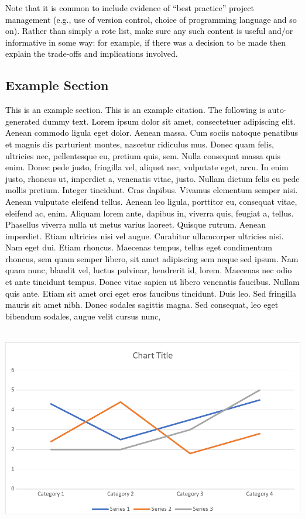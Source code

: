 \documentclass[a4paper]{article}
\begin{document}
\bigskip

\textcolor{black}{Note that it is common to include evidence of ``best practice'' project management (e.g., use of
version control, choice of programming language and so on). Rather than simply a rote list, make sure any such content
is useful and/or informative in some way: for example, if there was a decision to be made then explain the trade-offs
and implications involved.}


\bigskip

\subsection{Example Section}
\hypertarget{Toc98342035}{}
\bigskip

\textcolor{black}{This is an example section. This is an example citation. The following is auto-generated dummy text.
Lorem ipsum dolor sit amet, consectetuer adipiscing elit. Aenean commodo ligula eget dolor. Aenean massa. Cum sociis
natoque penatibus et magnis dis parturient montes, nascetur ridiculus mus. Donec quam felis, ultricies nec,
pellentesque eu, pretium quis, sem. Nulla consequat massa quis enim. Donec pede justo, fringilla vel, aliquet nec,
vulputate eget, arcu. In enim justo, rhoncus ut, imperdiet a, venenatis vitae, justo. Nullam dictum felis eu pede
mollis pretium. Integer tincidunt. Cras dapibus. Vivamus elementum semper nisi. Aenean vulputate eleifend tellus.
Aenean leo ligula, porttitor eu, consequat vitae, eleifend ac, enim. Aliquam lorem ante, dapibus in, viverra quis,
feugiat a, tellus. Phasellus viverra nulla ut metus varius laoreet. Quisque rutrum. Aenean imperdiet. Etiam ultricies
nisi vel augue. Curabitur ullamcorper ultricies nisi. Nam eget dui. Etiam rhoncus. Maecenas tempus, tellus eget
condimentum rhoncus, sem quam semper libero, sit amet adipiscing sem neque sed ipsum. Nam quam nunc, blandit vel,
luctus pulvinar, hendrerit id, lorem. Maecenas nec odio et ante tincidunt tempus. Donec vitae sapien ut libero
venenatis faucibus. Nullam quis ante. Etiam sit amet orci eget eros faucibus tincidunt. Duis leo. Sed fringilla mauris
sit amet nibh. Donec sodales sagittis magna. Sed consequat, leo eget bibendum sodales, augue velit cursus nunc,}


\bigskip

 \includegraphics[width=15.24cm,height=8.89cm]{Gimbalscope20Dissertation20PreTex-img002.pdf} 
\end{document}
